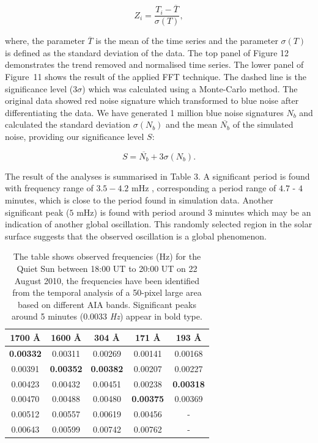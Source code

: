 \documentclass[physics,article,submit,pdftex,moreauthors]{Definitions/mdpi}
\begin{document}
\begin{equation}
	Z_{i} = \frac {T_{i} - \overline{T}}  {\sigma(T)},
	\label{z_score}
\end{equation}


where, the parameter $\overline{T}$ is the mean of the time series and the parameter $\sigma(T)$ is defined as the standard deviation of the data. The top panel of Figure 12 demonstrates the trend removed and normalised time series. The lower panel of Figure~11 shows the result of the applied FFT technique. The dashed line is the significance level ($3 \sigma$) which was calculated using a Monte-Carlo method. The original data showed red noise signature which transformed to blue noise after differentiating the data. We have generated 1 million blue noise signatures $N_{b}$ and calculated the standard deviation $\sigma(N_{b})$ and the mean $\overline{N_{b}}$ of the simulated noise, providing our significance level $S$:


\begin{equation}
    S = \overline{N_{b}} + 3 \sigma(N_{b}).
\end{equation}

The result of the analyses is summarised in Table 3. A significant period is found with frequency range of $3.5-4.2$ mHz , corresponding a period range of $4.7$ - $4$ minutes, which is close to the period found in simulation data. Another significant peak ($5$ mHz) is found with period around $3$ minutes which may be an indication of another global oscillation.  This randomly selected region in the solar surface suggests that the observed oscillation is a global phenomenon.

\begin{table}\label{qsfrequencies}
\centering
\begin{tabular}{c c c c c}
\hline
1700 {\AA}     &  1600 {\AA}   & 304 {\AA}     & 171 {\AA}     & 193 {\AA}    \\
\hline
{\bf 0.00332}  & 0.00311       & 0.00269       &  0.00141      & 0.00168      \\
\hline
0.00391	       & {\bf 0.00352} & {\bf 0.00382} & 0.00207       & 0.00227      \\
\hline
0.00423        & 0.00432	   & 0.00451       & 0.00238	   & {\bf0.00318} \\
\hline
0.00470        & 0.00488       & 0.00480	   & {\bf 0.00375} & 0.00369      \\
\hline
0.00512        & 0.00557       & 0.00619	   & 0.00456       & -            \\
\hline
0.00643	       & 0.00599	   & 0.00742       & 0.00762	   & -            \\

\hline
\end{tabular} 
\caption{The table shows observed frequencies (Hz) for the Quiet Sun between 18:00 UT to 20:00 UT on 22 August 2010, the frequencies have been identified from the temporal analysis of a 50-pixel large area based on different AIA bands. Significant peaks around 5 minutes (0.0033 {\it Hz}) appear in bold type.}
\label{FrequenciesQS}
\end{table}
\end{document}
